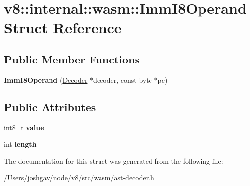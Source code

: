 \hypertarget{structv8_1_1internal_1_1wasm_1_1_imm_i8_operand}{}\section{v8\+:\+:internal\+:\+:wasm\+:\+:Imm\+I8\+Operand Struct Reference}
\label{structv8_1_1internal_1_1wasm_1_1_imm_i8_operand}
\subsection*{Public Member Functions}
\begin{DoxyCompactItemize}
\item 
{\bfseries Imm\+I8\+Operand} (\hyperlink{classv8_1_1internal_1_1wasm_1_1_decoder}{Decoder} $\ast$decoder, const byte $\ast$pc)\hypertarget{structv8_1_1internal_1_1wasm_1_1_imm_i8_operand_a1465fdc036473ca6b45f4f5c7cdec591}{}\label{structv8_1_1internal_1_1wasm_1_1_imm_i8_operand_a1465fdc036473ca6b45f4f5c7cdec591}

\end{DoxyCompactItemize}
\subsection*{Public Attributes}
\begin{DoxyCompactItemize}
\item 
int8\+\_\+t {\bfseries value}\hypertarget{structv8_1_1internal_1_1wasm_1_1_imm_i8_operand_acd7950c44ef9a819434afb54832e0f62}{}\label{structv8_1_1internal_1_1wasm_1_1_imm_i8_operand_acd7950c44ef9a819434afb54832e0f62}

\item 
int {\bfseries length}\hypertarget{structv8_1_1internal_1_1wasm_1_1_imm_i8_operand_ac1bffceaecee087bfc7e4e65912868ed}{}\label{structv8_1_1internal_1_1wasm_1_1_imm_i8_operand_ac1bffceaecee087bfc7e4e65912868ed}

\end{DoxyCompactItemize}


The documentation for this struct was generated from the following file\+:\begin{DoxyCompactItemize}
\item 
/\+Users/joshgav/node/v8/src/wasm/ast-\/decoder.\+h\end{DoxyCompactItemize}
